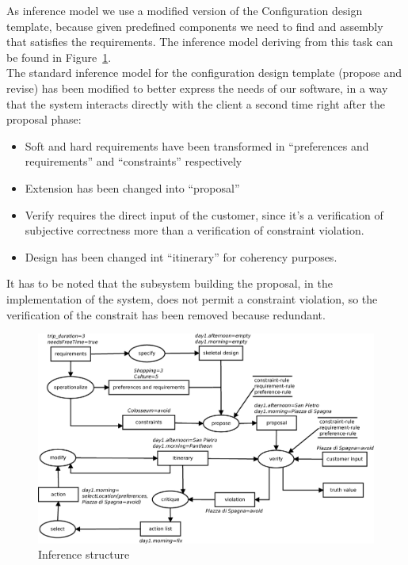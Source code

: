 \documentclass[11pt]{article} %
\begin{document}
As inference model we use a modified version of the Configuration design template, because given predefined components we need to find and assembly that satisfies the requirements. The inference model deriving from this task can be found in Figure~\ref{fig:inference}. \\
The standard inference model for the configuration design template (propose and revise) has been modified to better express the needs of our software, in a way that the system interacts directly with the client a second time right after the proposal phase: 
\begin{itemize}
\item Soft and hard requirements have been transformed in ``preferences and requirements'' and ``constraints'' respectively
\item Extension has been changed into ``proposal''
\item Verify requires the direct input of the customer, since it's a verification of subjective correctness more than a verification of constraint violation. 
\item Design has been changed int ``itinerary'' for coherency purposes.
\end{itemize}
It has to be noted that the subsystem building the proposal, in the implementation of the system, does not permit a constraint violation, so the verification of the constrait has been removed because redundant.

\begin{figure}[h]
\centering
\includegraphics[width=\textwidth]{images/inference.eps}
\caption{Inference structure}
\label{fig:inference}
\end{figure}
\end{document}
